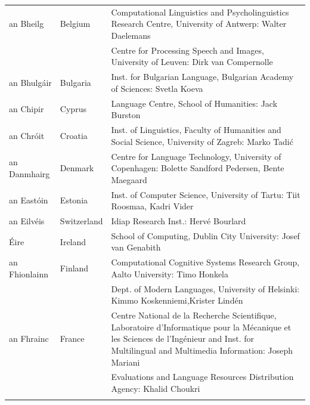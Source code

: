 \small
\begin{longtable}{@{}llp{113mm}@{}}
  an Bheilg & \textcolor{grey1}{Belgium} & Computational Linguistics and Psycholinguistics Research Centre, University of Antwerp: Walter Daelemans\\ \addlinespace
  & & Centre for Processing Speech and Images, University of Leuven: Dirk van Compernolle \\ \addlinespace
  
  an Bhulgáir & \textcolor{grey1}{Bulgaria} & Inst. for Bulgarian Language, Bulgarian Academy of Sciences: Svetla Koeva \\ \addlinespace
  
  an Chipir & \textcolor{grey1}{Cyprus} & Language Centre, School of Humanities: Jack Burston \\ \addlinespace
  
  an Chróit & \textcolor{grey1}{Croatia} & Inst. of Linguistics, Faculty of Humanities and Social Science, University of Zagreb: Marko Tadić \\ \addlinespace
  
  an Danmhairg &  \textcolor{grey1}{Denmark} & Centre for Language Technology, University of Copenhagen: \newline Bolette Sandford Pedersen, Bente Maegaard\\ \addlinespace
  
  an Eastóin & \textcolor{grey1}{Estonia} & Inst. of Computer Science, University of Tartu: Tiit Roosmaa, Kadri Vider\\ \addlinespace
  
  an Eilvéis & \textcolor{grey1}{Switzerland} & Idiap Research Inst.: Hervé Bourlard \\ \addlinespace
  
  Éire & \textcolor{grey1}{Ireland} & School of Computing, Dublin City University: Josef van Genabith\\ \addlinespace
  
  an Fhionlainn  & \textcolor{grey1}{Finland} & Computational Cognitive Systems Research Group, Aalto University: Timo Honkela\\ \addlinespace
  & & Dept. of Modern Languages, University of Helsinki: Kimmo Koskenniemi,\newline Krister Lindén \\ \addlinespace
  
  an Fhrainc & \textcolor{grey1}{France} & Centre National de la Recherche Scientifique, Laboratoire d'Informatique pour la Mécanique et les Sciences de l'Ingénieur and Inst. for Multilingual and Multimedia Information: Joseph Mariani \\ \addlinespace
  & & Evaluations and Language Resources Distribution Agency: Khalid Choukri\\ \addlinespace
  

\end{longtable}
